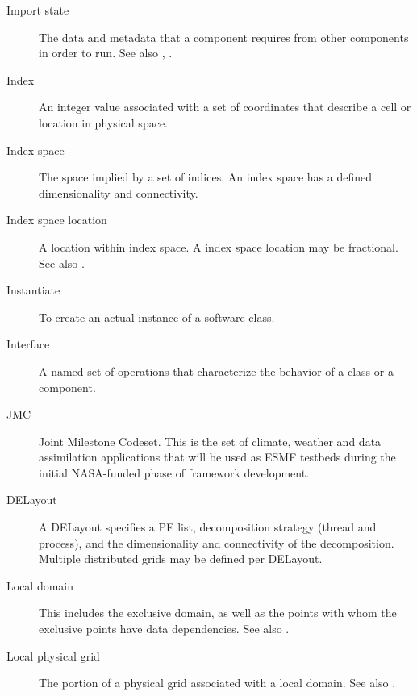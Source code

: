 \begin{description}
\item[Import state] \label{glos:ImportState} The data and metadata 
  that a component requires from other components in order to run.  
  See also , .

\item[Index] \label{glos:Index} An integer value associated with a set
  of coordinates that describe a cell or location in physical space.

\item[Index space] \label{glos:IndexSpace} The space implied 
  by a set of indices.  An index space has a defined dimensionality and 
  connectivity.

\item[Index space location] \label{glos:IndexSpaceloc} 
  A location within index space.  A index space location may be fractional.
  See also .

\item[Instantiate] \label{glos:Instantiate}
  To create an actual instance of a software class.

\item[Interface] \label{glos:Interface}
  A named set of operations that characterize the behavior of a class
  or a component.

\item[JMC] \label{glos:JMC} 
  Joint Milestone Codeset.  This is the set of climate, weather and
  data assimilation applications that will be used as ESMF testbeds 
  during the initial NASA-funded phase of framework development.

\item[DELayout] \label{glos:DELayout} A DELayout specifies a PE list, 
  decomposition strategy (thread and process), and the dimensionality 
  and connectivity of the decomposition.  Multiple distributed 
  grids may be defined per DELayout.

\item[Local domain] \label{glos:LocalDomain} This includes the exclusive 
  domain, as well as the points with whom the exclusive points have data 
  dependencies. See also .

\item[Local physical grid] \label{glos:LocPhysGrid} The portion of a 
  physical grid associated with a local domain.
  See also .  


\end{description}

